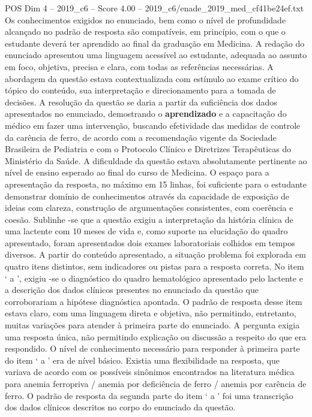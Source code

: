 \begin{textsample}{POS Dim 4 – 2019\_c6 – Score 4.00 – 2019\_c6/enade\_2019\_med\_cf41be24ef.txt}
Os conhecimentos exigidos no enunciado, bem como o nível de profundidade alcançado no padrão de resposta são compatíveis, em princípio, com o que o estudante deverá ter aprendido ao final da graduação em Medicina.
A redação do enunciado apresentou uma linguagem acessível ao estudante, adequada ao assunto em foco, objetiva, precisa e clara, com todas as referências necessárias.
A abordagem da questão estava contextualizada com estímulo ao exame crítico do tópico do conteúdo, sua interpretação e direcionamento para a tomada de decisões.
A resolução da questão se daria a partir da suficiência dos dados apresentados no enunciado, demostrando o \textbf{aprendizado} e a capacitação do médico em fazer uma intervenção, buscando efetividade das medidas de controle da carência de ferro, de acordo com a recomendação vigente da Sociedade Brasileira de Pediatria e com o Protocolo Clínico e Diretrizes Terapêuticas do Ministério da Saúde.
A dificuldade da questão estava absolutamente pertinente ao nível de ensino esperado ao final do curso de Medicina.
O espaço para a apresentação da resposta, no máximo em 15 linhas, foi suficiente para o estudante demonstrar domínio de conhecimentos através da capacidade de exposição de ideias com clareza, construção de argumentações consistentes, com coerência e coesão.
Sublinhe -se que a questão exigiu a interpretação da história clínica de uma lactente com 10 meses de vida e, como suporte na elucidação do quadro apresentado, foram apresentados dois exames laboratoriais colhidos em tempos diversos.
A partir do conteúdo apresentado, a situação problema foi explorada em quatro itens distintos, sem indicadores ou pistas para a resposta correta.
No item ‘ a ’, exigiu -se o diagnóstico do quadro hematológico apresentado pelo lactente e a descrição dos dados clínicos presentes no enunciado da questão que corroborariam a hipótese diagnóstica apontada.
O padrão de resposta desse item estava claro, com uma linguagem direta e objetiva, não permitindo, entretanto, muitas variações para atender à primeira parte do enunciado.
A pergunta exigia uma resposta única, não permitindo explicação ou discussão a respeito do que era respondido.
O nível de conhecimento necessário para responder à primeira parte do item ‘ a ’ era de nível básico.
Existia uma flexibilidade na resposta, que variava de acordo com os possíveis sinônimos encontrados na literatura médica para anemia ferropriva / anemia por deficiência de ferro / anemia por carência de ferro.
O padrão de resposta da segunda parte do item ‘ a ’ foi uma transcrição dos dados clínicos descritos no corpo do enunciado da questão.

\end{textsample}
